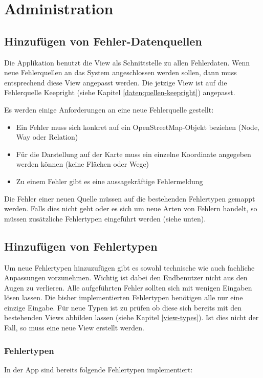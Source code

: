 \chapter{Administration}
\label{administration}

\section{Hinzufügen von Fehler-Datenquellen}
\label{additional-error-source}
Die Applikation benutzt die View  als Schnittstelle zu allen Fehlerdaten.
Wenn neue Fehlerquellen an das System angeschlossen werden sollen, dann muss entsprechend diese View angepasst werden.
Die jetzige View ist auf die Fehlerquelle Keepright (siehe Kapitel \ref{datenquellen-keepright}) angepasst.

Es werden einige Anforderungen an eine neue Fehlerquelle gestellt:
\begin{itemize}
\item Ein Fehler muss sich konkret auf ein OpenStreetMap-Objekt beziehen (Node, Way oder Relation)
\item Für die Darstellung auf der Karte muss ein einzelne Koordinate angegeben werden können (keine Flächen oder Wege)
\item Zu einem Fehler gibt es eine aussagekräftige Fehlermeldung
\end{itemize}

Die Fehler einer neuen Quelle müssen auf die bestehenden Fehlertypen gemappt werden.
Falls dies nicht geht oder es sich um neue Arten von Fehlern handelt, so müssen zusätzliche Fehlertypen eingeführt werden (siehe unten).

\section{Hinzufügen von Fehlertypen}
\label{additional-error-type}
Um neue Fehlertypen hinzuzufügen gibt es sowohl technische wie auch fachliche Anpassungen vorzunehmen.
Wichtig ist dabei den Endbenutzer nicht aus den Augen zu verlieren.
Alle aufgeführten Fehler sollten sich mit wenigen Eingaben lösen lassen.
Die bisher implementierten Fehlertypen benötigen alle nur eine einzige Eingabe.
Für neue Typen ist zu prüfen ob diese sich bereits mit den bestehenden Views abbilden lassen (siehe Kapitel \ref{view-types}).
Ist dies nicht der Fall, so muss eine neue View erstellt werden.

\subsection{Fehlertypen}
In der App sind bereits folgende Fehlertypen implementiert:

